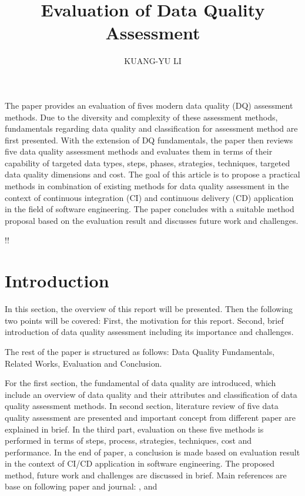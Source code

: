 \documentclass[pdftex,english,oribibl]{llncs}
\title{Evaluation of Data Quality Assessment}
\author{KUANG-YU LI}
\institute{University of Stuttgart\\Master Student in Information Technology \\70569 Stuttgart, Germany}
\makeatletter
\gdef\@keywords{}
\renewenvironment{abstract}{%
  \list{}{\advance\topsep by0.35cm\relax\small%
          \leftmargin=1cm%
          \labelwidth=\z@%
          \listparindent=\z@%
          \itemindent\listparindent%
          \rightmargin\leftmargin}%
          \item[\hskip\labelsep\bfseries\abstractname]}{%
  \if!\@keywords!\else{\item[~]\item[\hskip\labelsep\bfseries\keywordname]\@keywords}\fi%
  \endlist}
\makeatother
\begin{document}
\maketitle

\begin{abstract}
   The paper provides an evaluation of fives modern data quality (DQ) assessment methods. Due to the diversity and complexity of these assessment methods, fundamentals regarding data quality and classification for assessment method are first presented. With the extension of DQ fundamentals, the paper then reviews five data quality assessment methods and evaluates them in terms of their capability of targeted data types, steps, phases, strategies, techniques, targeted data quality dimensions and cost. The goal of this article is to propose a practical methods in combination of existing methods for data quality assessment  in the context of  continuous integration (CI) and  continuous delivery (CD) application in the field of software engineering. The paper concludes with a suitable method proposal based on the evaluation result and discusses future work and challenges.

\end{abstract}
\section{Introduction}
In this section, the overview of this report will be presented.
Then the following two points will be covered:
First, the motivation for this report.
Second, brief introduction of data quality assessment including its importance and challenges.

The rest of the paper is structured as follows: Data Quality Fundamentals, Related Works, Evaluation and Conclusion.

For the first section, the fundamental of data quality are introduced, which include
an overview of data quality and their attributes and classification of data quality assessment methods.
In second section, literature review of five data quality assessment are presented and important concept from different paper are explained in brief.
In the third part, evaluation on these five methods is performed in terms of steps, process, strategies, techniques, cost and performance.
In the end of paper, a conclusion is made based on evaluation result in the context of CI/CD application in software engineering.
The proposed method, future work and challenges are discussed in brief.
Main references are base on following paper and journal: \citet{Cai2005ChallnegesOfDataQuality}, \citet{Pipino2002DataQualityAssessment} and \citet{Batini2009MethodologiesForDataQuality} \citet{Wang1996BeyondAccuracy} \citet{Borek2011AClassficationOfDataQualityAssessmentMethods}
   \citet{Cappiello2004DataQualityAssessmentfromTheUse}
\end{document}
